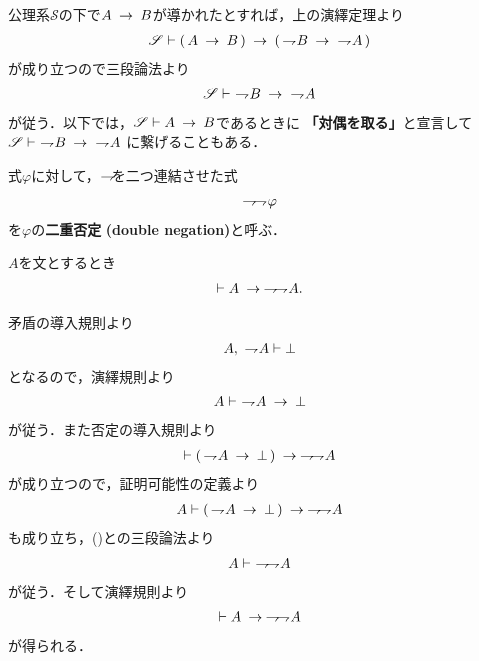 	公理系$\mathscr{S}$の下で$A \rarrow B$が導かれたとすれば，上の演繹定理より
	\begin{align}
		\mathscr{S} \vdash (\, A \rarrow B\, ) 
		\rarrow (\, \negation B \rarrow\ \negation A\, )
	\end{align}
	が成り立つので三段論法より
	\begin{align}
		\mathscr{S} \vdash\ \negation B \rarrow\ \negation A
	\end{align}
	が従う．以下では，$\mathscr{S} \vdash A \rarrow B$であるときに
	{\bf 「対偶を取る」}と宣言して$\mathscr{S} \vdash\ \negation B \rarrow\ \negation A$
	に繋げることもある．
	
	\begin{screen}
		\begin{dfn}[二重否定]
			式$\varphi$に対して，$\negation$を二つ連結させた式
			\begin{align}
				\negation \negation \varphi
			\end{align}
			を$\varphi$の{\bf 二重否定}
			{\bf (double negation)}と呼ぶ．
		\end{dfn}
	\end{screen}
		
	\begin{screen}
		\begin{logicalthm}[二重否定の導入]
		\label{logicalthm:introduction_of_double_negation}
			$A$を文とするとき
			\begin{align}
				\vdash A \rarrow \negation \negation A.
			\end{align}
		\end{logicalthm}
	\end{screen}
	
	\begin{prf}
		矛盾の導入規則より
		\begin{align}
			A,\ \negation A \vdash \bot
		\end{align}
		となるので，演繹規則より
		\begin{align}
			A \vdash\ \negation A \rarrow \bot
			\label{fom:introduction_of_double_negation}
		\end{align}
		が従う．また否定の導入規則より
		\begin{align}
			\vdash (\, \negation A \rarrow \bot\, ) \rarrow \negation \negation A
		\end{align}
		が成り立つので，証明可能性の定義より
		\begin{align}
			A \vdash (\, \negation A \rarrow \bot\, ) \rarrow \negation \negation A
		\end{align}
		も成り立ち，()との三段論法より
		\begin{align}
			A \vdash\ \negation \negation A
		\end{align}
		が従う．そして演繹規則より
		\begin{align}
			\vdash A \rarrow \negation \negation A
		\end{align}
		が得られる．
		\QED
	\end{prf}
	
